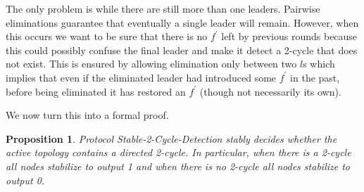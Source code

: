 \documentclass[preprint]{elsarticle}
\newtheorem{proposition}{Proposition}
\begin{document}
The only problem is while there are still more than one leaders. Pairwise
eliminations guarantee that eventually a single leader will remain.
However, when this occurs we want to be sure that there is no $f^\prime$ left by
previous rounds because this could possibly confuse the final leader and make it
detect a 2-cycle that does not exist. This is ensured by allowing
elimination only between two $l$s which implies that even if the eliminated
leader had introduced some $f^\prime$ in the past, before being eliminated it has
restored an $f^\prime$ (though not necessarily its own). 

We now turn this into a formal proof.

\begin{proposition}
Protocol Stable-2-Cycle-Detection stably decides whether the active topology contains a directed 2-cycle. In particular, when there is a 2-cycle all nodes stabilize to output 1 and when there is no 2-cycle all nodes stabilize to output 0.
\end{proposition}
\end{document}
